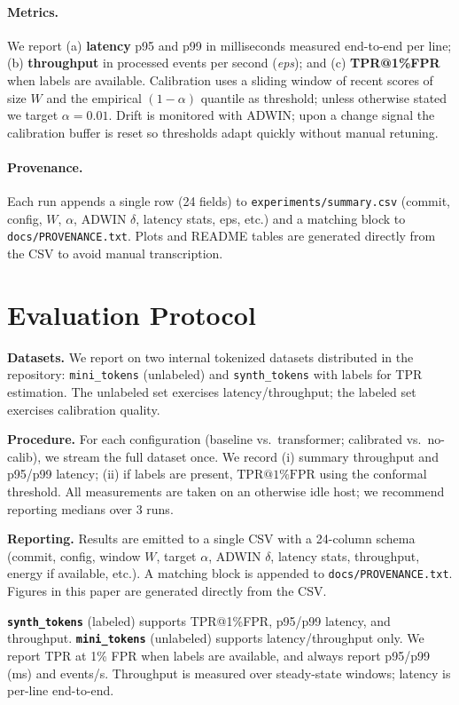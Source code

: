 \documentclass[10pt,twocolumn]{article}
\begin{document}
\paragraph{Metrics.} We report (a) \textbf{latency} p95 and p99 in milliseconds measured end-to-end per line; (b) \textbf{throughput} in processed events per second (\emph{eps}); and (c) \textbf{TPR@1\%FPR} when labels are available. Calibration uses a sliding window of recent scores of size $W$ and the empirical $(1{-}\alpha)$ quantile as threshold; unless otherwise stated we target $\alpha{=}0.01$. Drift is monitored with ADWIN; upon a change signal the calibration buffer is reset so thresholds adapt quickly without manual retuning.

\paragraph{Provenance.} Each run appends a single row (24 fields) to \texttt{experiments/summary.csv} (commit, config, $W$, $\alpha$, ADWIN $\delta$, latency stats, eps, etc.) and a matching block to \texttt{docs/PROVENANCE.txt}. Plots and README tables are generated directly from the CSV to avoid manual transcription.


\section{Evaluation Protocol}
\textbf{Datasets.} We report on two internal tokenized datasets distributed in the repository: \texttt{mini\_tokens} (unlabeled) and \texttt{synth\_tokens} with labels for TPR estimation. The unlabeled set exercises latency/throughput; the labeled set exercises calibration quality.

\textbf{Procedure.} For each configuration (baseline vs.\ transformer; calibrated vs.\ no-calib), we stream the full dataset once. We record (i) summary throughput and p95/p99 latency; (ii) if labels are present, $\mathrm{TPR}@1\% \mathrm{FPR}$ using the conformal threshold. All measurements are taken on an otherwise idle host; we recommend reporting medians over 3 runs.

\textbf{Reporting.} Results are emitted to a single CSV with a 24-column schema (commit, config, window $W$, target $\alpha$, ADWIN $\delta$, latency stats, throughput, energy if available, etc.). A matching block is appended to \texttt{docs/PROVENANCE.txt}. Figures in this paper are generated directly from the CSV.


\textbf{\texttt{synth\_tokens}} (labeled) supports TPR@1\%FPR, p95/p99 latency, and throughput. \textbf{\texttt{mini\_tokens}} (unlabeled) supports latency/throughput only. We report TPR at 1\% FPR when labels are available, and always report p95/p99 (ms) and events/s. Throughput is measured over steady-state windows; latency is per-line end-to-end.
\end{document}
